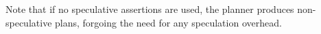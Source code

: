 %
%
Note that if no speculative assertions are used, the planner produces
non-speculative plans, forgoing the need for any speculation overhead.

